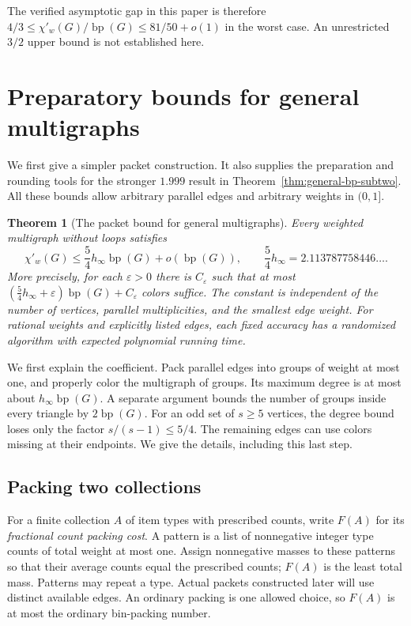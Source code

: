 \documentclass[11pt]{article}
\newtheorem{theorem}{Theorem}[section]
\theoremstyle{definition}\newtheorem{algorithm}{Algorithm}[section]
\numberwithin{equation}{section}
\theoremstyle{remark}\newtheorem*{remark}{Remark}
\newcommand{\bp}{\operatorname{bp}}
\begin{document}
The verified asymptotic gap in this paper is therefore
$4/3\le\chi'_w(G)/\bp(G)\le81/50+o(1)$ in the worst case.
An unrestricted $3/2$ upper bound is not established here.

\section{Preparatory bounds for general multigraphs}
\label{sec:general-bp}

We first give a simpler packet construction. It also supplies the
preparation and rounding tools for the stronger $1.999$ result in
Theorem~\ref{thm:general-bp-subtwo}. All these bounds allow arbitrary
parallel edges and arbitrary weights in $(0,1]$.

\begin{theorem}[The packet bound for general multigraphs]
\label{thm:general-bp-baseline}
Every weighted multigraph without loops satisfies
\[
 \chi'_w(G)\le \frac54h_\infty\bp(G)+o(\bp(G)),
 \qquad \frac54h_\infty=2.113787758446\ldots.
\]
More precisely, for each $\varepsilon>0$ there is $C_\varepsilon$ such
that at most $(\frac54h_\infty+\varepsilon)\bp(G)+C_\varepsilon$
colors suffice. The constant is independent of the number of vertices,
parallel multiplicities, and the smallest edge weight. For rational
weights and explicitly listed edges, each fixed accuracy has a
randomized algorithm with expected polynomial running time.
\end{theorem}

We first explain the coefficient. Pack parallel edges into groups of
weight at most one, and properly color the multigraph of groups. Its
maximum degree is at most about $h_\infty\bp(G)$. A separate argument
bounds the number of groups inside every triangle by $2\bp(G)$.
For an odd set of $s\ge5$ vertices, the degree bound loses only the
factor $s/(s-1)\le5/4$. The remaining edges can use colors missing at
their endpoints. We give the details, including this last step.

\subsection{Packing two collections}



For a finite collection $A$ of item types with prescribed counts, write
$F(A)$ for its \emph{fractional count packing cost}. A pattern is a
list of nonnegative integer type counts of total weight at most one.
Assign nonnegative masses to these patterns so that their average
counts equal the prescribed counts; $F(A)$ is the least total mass.
Patterns may repeat a type. Actual packets constructed later will use
distinct available edges. An ordinary packing is one allowed choice,
so $F(A)$ is at most the ordinary bin-packing number.
\end{document}
